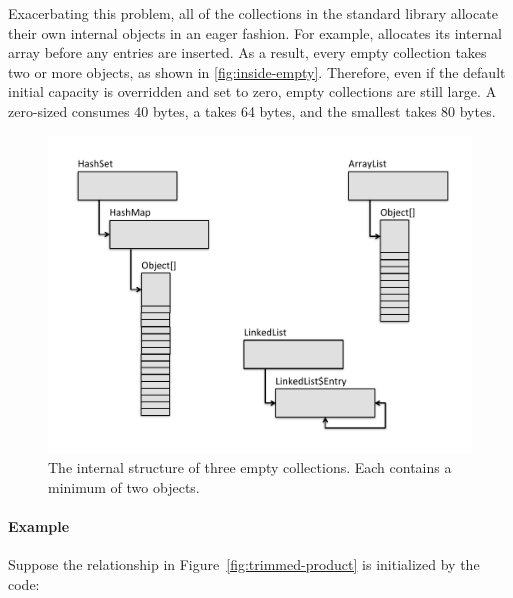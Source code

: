 Exacerbating this
problem, all of the collections in the standard library allocate their own
internal objects in an eager fashion. For example,  allocates its internal array before any
entries are inserted. As a result, every empty collection
takes two or more objects, as shown in \autoref{fig:inside-empty}. Therefore,
even if the default initial capacity is overridden and set to zero, empty collections are still large. A zero-sized 
consumes 40 bytes, a  takes 64 bytes, and the smallest
 takes 80 bytes. 



 \begin{figure}
  \centering
 \includegraphics[width=.80\textwidth]{part1/Figures/collections/inside-empty.pdf}
  \caption{The internal structure of three empty collections. Each
  contains a minimum of two objects.}
  \label{fig:inside-empty}
\end{figure}



\paragraph{Example} Suppose the relationship
in Figure~\ref{fig:trimmed-product} is initialized by the code:

